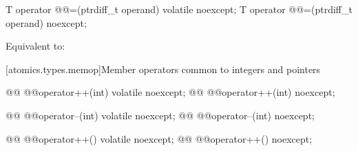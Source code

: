 %
%
\begin{itemdecl}
T operator @@=(ptrdiff_t operand) volatile noexcept;
T operator @@=(ptrdiff_t operand) noexcept;
\end{itemdecl}

\begin{itemdescr}
\pnum
\effects Equivalent to: 
\end{itemdescr}

[atomics.types.memop]{Member operators common to integers and pointers}

%
%
\begin{itemdecl}
@@ @@operator++(int) volatile noexcept;
@@ @@operator++(int) noexcept;
\end{itemdecl}

\begin{itemdescr}
\pnum
{}

\end{itemdescr}

%
%
\begin{itemdecl}
@@ @@operator--(int) volatile noexcept;
@@ @@operator--(int) noexcept;
\end{itemdecl}

\begin{itemdescr}
\pnum
{}

\end{itemdescr}

%
%
\begin{itemdecl}
@@ @@operator++() volatile noexcept;
@@ @@operator++() noexcept;
\end{itemdecl}

